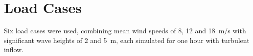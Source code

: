 \chapter{Load Cases}
\label{app:a}

Six load cases were used, combining mean wind speeds of 8, 12 and 18~m/s with significant wave
heights of 2 and 5~m, each simulated for one hour with turbulent inflow.
